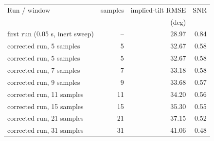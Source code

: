 \begin{tabular}{lrrr}
\toprule
Run / window & samples & implied-tilt RMSE & SNR \\
 & & (deg) & \\
\midrule
first run (0.05 s, inert sweep) & -- & 28.97 & 0.84 \\
corrected run, 5 samples & 5 & 32.67 & 0.58 \\
\midrule
corrected run, 5 samples & 5 & 32.67 & 0.58 \\
corrected run, 7 samples & 7 & 33.18 & 0.58 \\
corrected run, 9 samples & 9 & 33.68 & 0.57 \\
corrected run, 11 samples & 11 & 34.20 & 0.56 \\
corrected run, 15 samples & 15 & 35.30 & 0.55 \\
corrected run, 21 samples & 21 & 37.15 & 0.52 \\
corrected run, 31 samples & 31 & 41.06 & 0.48 \\
\bottomrule
\end{tabular}
